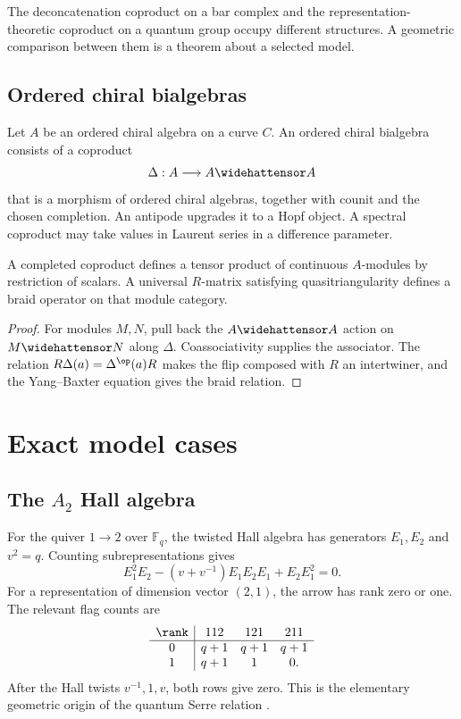 The deconcatenation coproduct on a bar complex and the representation-theoretic coproduct on a quantum group occupy different structures. A geometric comparison between them is a theorem about a selected model.

\chapter{Ordered chiral bialgebras}
Let $A$ be an ordered chiral algebra on a curve $C$. An ordered chiral bialgebra consists of a coproduct
\[
 \Delta:A\longrightarrow A\widehattensor A
\]
that is a morphism of ordered chiral algebras, together with counit and the chosen completion. An antipode upgrades it to a Hopf object. A spectral coproduct may take values in Laurent series in a difference parameter.

\begin{theorem}
A completed coproduct defines a tensor product of continuous $A$-modules by restriction of scalars. A universal $R$-matrix satisfying quasitriangularity defines a braid operator on that module category.
\end{theorem}
\begin{proof}
For modules $M,N$, pull back the $A\widehattensor A$ action on $M\widehattensor N$ along $\Delta$. Coassociativity supplies the associator. The relation $R\Delta(a)=\Delta^{\op}(a)R$ makes the flip composed with $R$ an intertwiner, and the Yang--Baxter equation gives the braid relation.
\end{proof}

\part{Exact model cases}

\chapter{The \texorpdfstring{$A_2$}{A2} Hall algebra}
For the quiver $1\to2$ over $\mathbb F_q$, the twisted Hall algebra has generators $E_1,E_2$ and $v^2=q$. Counting subrepresentations gives
\[
 E_1^2E_2-(v+v^{-1})E_1E_2E_1+E_2E_1^2=0.
\]
For a representation of dimension vector $(2,1)$, the arrow has rank zero or one. The relevant flag counts are
\[
\begin{array}{c|ccc}
\rank&112&121&211\\ \hline
0&q+1&q+1&q+1\\
1&q+1&1&0.
\end{array}
\]
After the Hall twists $v^{-1},1,v$, both rows give zero. This is the elementary geometric origin of the quantum Serre relation \cite{Ringel,Green}.

